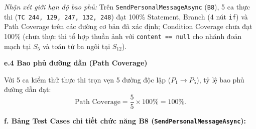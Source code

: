 \documentclass[11pt,a4paper]{article}
\begin{document}
\noindent\textit{Nhận xét giới hạn độ bao phủ:} Trên \texttt{SendPersonalMessageAsync} (\texttt{B8}), 5 ca thực thi (\texttt{TC 244, 129, 247, 132, 248}) đạt 100\% Statement, Branch (4 nút \texttt{if}) và Path Coverage trên các đường cơ bản đã xác định; Condition Coverage chưa đạt 100\% (chưa thực thi tổ hợp thuần ảnh với \texttt{content == null} cho nhánh đoản mạch tại $S_5$ và toán tử ba ngôi tại $S_{12}$).

\noindent\textbf{e.4 Bao phủ đường dẫn (Path Coverage)}

\noindent Với 5 ca kiểm thử thực thi trọn vẹn 5 đường độc lập ($P_1 \rightarrow P_5$), tỷ lệ bao phủ đường dẫn đạt:
\[
\text{Path Coverage} = \frac{5}{5} \times 100\% = 100\%.
\]

\noindent\textbf{f. Bảng Test Cases chi tiết chức năng B8 (\texttt{SendPersonalMessageAsync}):}
\begingroup
\scriptsize
\setlength{\tabcolsep}{3pt}
\end{document}
